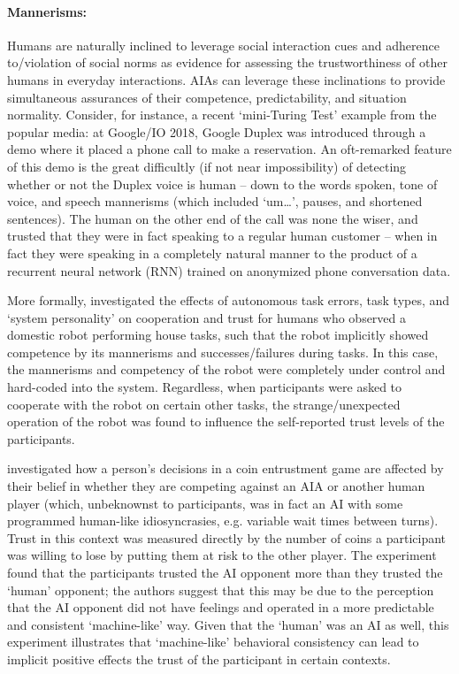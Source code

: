 \paragraph{Mannerisms:}
Humans are naturally inclined to leverage social interaction cues and adherence to/violation of social norms as evidence for assessing the trustworthiness of other humans in everyday interactions. 
AIAs can leverage these inclinations to provide simultaneous assurances of their competence, predictability, and situation normality. 
Consider, for instance, a recent `mini-Turing Test' example from the popular media: at Google/IO 2018, Google Duplex \cite{Google2018-eb} was introduced through a demo where it placed a phone call to make a reservation. 
An oft-remarked feature of this demo is the great difficultly (if not near impossibility) of detecting whether or not the Duplex voice is human -- down to the words spoken, tone of voice, and speech mannerisms (which included `um\ldots', pauses, and shortened sentences). 
The human on the other end of the call was none the wiser, and trusted that they were in fact speaking to a regular human customer -- when in fact they were speaking in a completely natural manner to the product of a recurrent neural network (RNN) trained on anonymized phone conversation data. 

More formally, \citet{Salem2015-md} investigated the effects of autonomous task errors, task types, and `system personality' on cooperation and trust for humans who observed a domestic robot performing house tasks, such that the robot implicitly showed competence by its mannerisms and successes/failures during tasks. In this case, the mannerisms and competency of the robot were completely under control and hard-coded into the system. Regardless, when participants were asked to cooperate with the robot on certain other tasks, the strange/unexpected operation of the robot was found to influence the self-reported trust levels of the participants.

\citet{Wu2016-ei} investigated how a person's decisions in a coin entrustment game are affected by their belief in whether they are competing against an AIA or another human player (which, unbeknownst to participants, was in fact an AI with some programmed human-like idiosyncrasies, e.g. variable wait times between turns). Trust in this context was measured directly by the number of coins a participant was willing to lose by putting them at risk to the other player. The experiment found that the participants trusted the AI opponent more than they trusted the `human' opponent; the authors suggest that this may be due to the perception that the AI opponent did not have feelings and operated in a more predictable and consistent `machine-like' way. Given that the `human' was an AI as well, this experiment illustrates that `machine-like' behavioral consistency can lead to implicit positive effects the trust of the participant in certain contexts.

